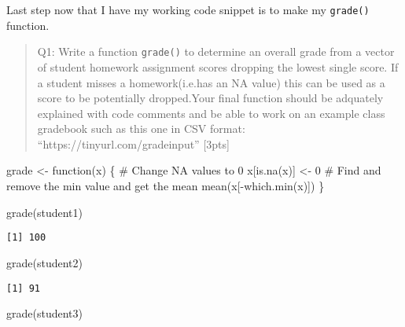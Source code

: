 \documentclass[
  letterpaper,
  DIV=11,
  numbers=noendperiod]{scrartcl}
\newenvironment{Shaded}{\begin{snugshade}}{\end{snugshade}}
\newcommand{\CommentTok}[1]{\textcolor[rgb]{0.37,0.37,0.37}{#1}}
\newcommand{\ControlFlowTok}[1]{\textcolor[rgb]{0.00,0.23,0.31}{#1}}
\newcommand{\DecValTok}[1]{\textcolor[rgb]{0.68,0.00,0.00}{#1}}
\newcommand{\FunctionTok}[1]{\textcolor[rgb]{0.28,0.35,0.67}{#1}}
\newcommand{\NormalTok}[1]{\textcolor[rgb]{0.00,0.23,0.31}{#1}}
\newcommand{\OtherTok}[1]{\textcolor[rgb]{0.00,0.23,0.31}{#1}}
\newcommand{\SpecialCharTok}[1]{\textcolor[rgb]{0.37,0.37,0.37}{#1}}
\begin{document}
Last step now that I have my working code snippet is to make my
\texttt{grade()} function.

\begin{quote}
Q1: Write a function \texttt{grade()} to determine an overall grade from
a vector of student homework assignment scores dropping the lowest
single score. If a student misses a homework(i.e.has an NA value) this
can be used as a score to be potentially dropped.Your final function
should be adquately explained with code comments and be able to work on
an example class gradebook such as this one in CSV format:
``https://tinyurl.com/gradeinput'' {[}3pts{]}
\end{quote}

\begin{Shaded}
\begin{Highlighting}[]
\NormalTok{grade }\OtherTok{\textless{}{-}} \ControlFlowTok{function}\NormalTok{(x) \{}
  \CommentTok{\# Change NA values to 0}
\NormalTok{  x[}\FunctionTok{is.na}\NormalTok{(x)] }\OtherTok{\textless{}{-}} \DecValTok{0}
  \CommentTok{\# Find and remove the min value and get the mean}
  \FunctionTok{mean}\NormalTok{(x[}\SpecialCharTok{{-}}\FunctionTok{which.min}\NormalTok{(x)])}
\NormalTok{\}}
\end{Highlighting}
\end{Shaded}

\begin{Shaded}
\begin{Highlighting}[]
\FunctionTok{grade}\NormalTok{(student1)}
\end{Highlighting}
\end{Shaded}

\begin{verbatim}
[1] 100
\end{verbatim}

\begin{Shaded}
\begin{Highlighting}[]
\FunctionTok{grade}\NormalTok{(student2)}
\end{Highlighting}
\end{Shaded}

\begin{verbatim}
[1] 91
\end{verbatim}

\begin{Shaded}
\begin{Highlighting}[]
\FunctionTok{grade}\NormalTok{(student3)}
\end{Highlighting}
\end{Shaded}
\end{document}
